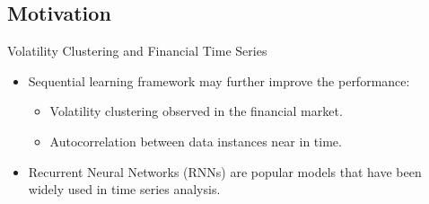 \documentclass[10pt,table,mathserif]{beamer}
\begin{document}
\subsection{Motivation}
\begin{frame}{Volatility Clustering and Financial Time Series}
\begin{itemize}
\item
Sequential learning framework may further improve the performance:
\begin{itemize}
  \item Volatility clustering observed in the financial market.
  \item Autocorrelation between data instances near in time.
\end{itemize}
\item Recurrent Neural Networks (RNNs) are popular models that have been widely used in time series analysis.
\end{itemize}
\end{frame}
\end{document}
